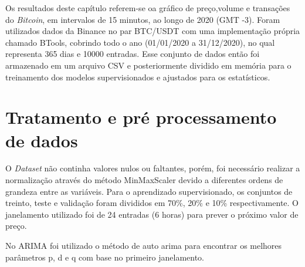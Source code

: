 Os resultados deste capítulo referem-se oa gráfico de preço,volume e transações do \textit{Bitcoin}, em intervalos de 15 minutos, ao longo de 2020 (GMT -3). Foram utilizados dados da Binance no par BTC/USDT com uma implementação própria chamado BTools, cobrindo todo o ano (01/01/2020 a 31/12/2020), no qual representa 365 dias e 10000 entradas. 
Esse conjunto de dados então foi armazenado em um arquivo CSV e posteriormente dividido em memória para o treinamento dos modelos supervisionados e ajustados para os estatísticos.

\section{Tratamento e pré processamento de dados}
O \textit{Dataset} não continha valores nulos ou faltantes, porém, foi necessário realizar a normalização através do método MinMaxScaler devido a diferentes ordens de grandeza entre as variáveis.
Para o aprendizado supervisionado, os conjuntos de treinto, teste e validação foram divididos em 70\%, 20\% e 10\% respectivamente. 
O janelamento utilizado foi de 24 entradas (6 horas) para prever o próximo valor de preço.

No ARIMA foi utilizado o método de auto arima para encontrar os melhores parâmetros p, d e q com base no primeiro janelamento.